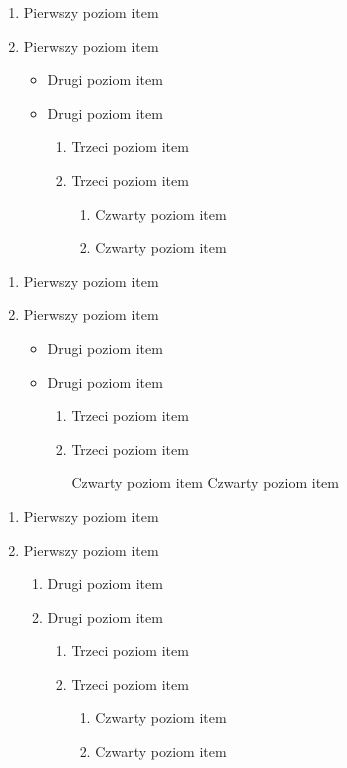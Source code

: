 \documentclass[a4paper,12pt]{article}
\begin{document}
	
	\begin{enumerate}
		\item Pierwszy poziom item
		\item Pierwszy poziom item
		\begin{itemize}
			\item Drugi poziom item
			\item Drugi poziom item
			\begin{enumerate}
				\item Trzeci poziom item
				\item Trzeci poziom item
				\begin{enumerate}
					\item Czwarty poziom item
					\item Czwarty poziom item
				\end{enumerate}
			\end{enumerate}
		\end{itemize}
	\end{enumerate}
	
	
	\begin{enumerate}
		\item Pierwszy poziom item
		\item Pierwszy poziom item
		\begin{itemize}
			\item Drugi poziom item
			\item Drugi poziom item
			\begin{enumerate}
				\item Trzeci poziom item
				\item Trzeci poziom item
				\begin{itemize}
					\textendash Czwarty poziom item\newline
					\textendash Czwarty poziom item
				\end{itemize}
			\end{enumerate}
		\end{itemize}
	\end{enumerate}
	
	
	\begin{enumerate}
		\item Pierwszy poziom item
		\item Pierwszy poziom item
		\begin{enumerate}
			\item Drugi poziom item
			\item Drugi poziom item
			\begin{enumerate}
				\item Trzeci poziom item
				\item Trzeci poziom item
				\begin{enumerate}
					\item Czwarty poziom item
					\item Czwarty poziom item
				\end{enumerate}
			\end{enumerate}
		\end{enumerate}
	\end{enumerate}
	
\end{document}

